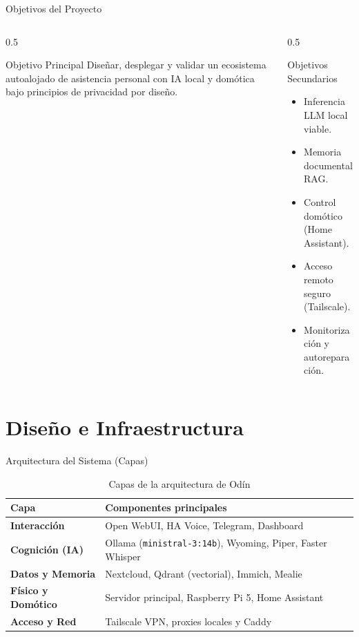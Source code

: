 \documentclass[11pt]{beamer}
\begin{document}
\begin{frame}{Objetivos del Proyecto}
  \begin{columns}
    \begin{column}{0.5\textwidth}
      \begin{block}{Objetivo Principal}
        Diseñar, desplegar y validar un ecosistema autoalojado de asistencia personal con IA local y domótica bajo principios de privacidad por diseño.
      \end{block}
    \end{column}
    \begin{column}{0.5\textwidth}
      \begin{block}{Objetivos Secundarios}
        \begin{itemize}
          \item Inferencia LLM local viable.
          \item Memoria documental RAG.
          \item Control domótico (Home Assistant).
          \item Acceso remoto seguro (Tailscale).
          \item Monitorización y autoreparación.
        \end{itemize}
      \end{block}
    \end{column}
  \end{columns}
\end{frame}

\section{Diseño e Infraestructura}

\begin{frame}{Arquitectura del Sistema (Capas)}
  \begin{table}
    \centering
    \caption{Capas de la arquitectura de Odín}
    \label{tab:capas}
    \begin{tabularx}{\textwidth}{lX}
      \toprule
      Capa & Componentes principales \\
      \midrule
      \textbf{Interacción} & Open WebUI, HA Voice, Telegram, Dashboard \\
      \textbf{Cognición (IA)} & Ollama (\texttt{ministral-3:14b}), Wyoming, Piper, Faster Whisper \\
      \textbf{Datos y Memoria} & Nextcloud, Qdrant (vectorial), Immich, Mealie \\
      \textbf{Físico y Domótico} & Servidor principal, Raspberry Pi 5, Home Assistant \\
      \textbf{Acceso y Red} & Tailscale VPN, proxies locales y Caddy \\
      \bottomrule
    \end{tabularx}
  \end{table}
\end{frame}
\end{document}
